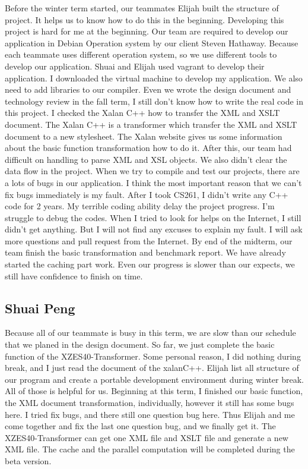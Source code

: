 Before the winter term started, our teammates Elijah built the structure of project. 
It helps us to know how to do this in the beginning. 
Developing this project is hard for me at the beginning.
Our team are required to develop our application in Debian Operation system by our client Steven Hathaway.
Because each teammate uses different operation system, so we use different tools to develop our application.
Shuai and Elijah used vagrant to develop their application.
I downloaded the virtual machine to develop my application.
We also need to add libraries to our compiler.  
Even we wrote the design document and technology review in the fall term, I still don't know how to write the real code in this project. 
I checked the Xalan C++ how to transfer the XML and XSLT document.
The Xalan C++ is a transformer which transfer the XML and XSLT document to a new stylesheet.
The Xalan website gives us some information about the basic function transformation how to do it. 
After this, our team had difficult on handling to parse XML and XSL objects.
We also didn't clear the data flow in the project. 
When we try to compile and test our projects, there are a lots of bugs in our application. 
I think the most important reason that we can’t fix bugs immediately is my fault. 
After I took CS261, I didn’t write any C++ code for 2 years. 
My terrible coding ability delay the project progress. I’m struggle to debug the codes. 
When I tried to look for helps on the Internet, I still didn’t get anything.
But I will not find any excuses to explain my fault. 
I will ask more questions and pull request from the Internet. 
By end of the midterm, our team finish the basic transformation and benchmark report.
We have already started the caching part work. 
Even our progress is slower than our expects, we still have confidence to finish on time. 

\subsection{Shuai Peng}

Because all of our teammate is busy in this term, we are slow than our schedule that we planed in the design document. 
So far, we just complete the basic function of the XZES40-Transformer.
Some personal reason, I did nothing during break, and I just read the document of the xalanC++.
Elijah list all structure of our program and create a portable development environment during winter break. 
All of those is helpful for us.
Beginning at this term, I finished our basic function, the XML document transformation, individually, however it still has some bugs here.
I tried fix bugs, and there still one question bug here.
Thus Elijah and me come together and fix the last one question bug, and we finally get it.
The XZES40-Transformer can get one XML file and XSLT file and generate a new XML file.
The cache and the parallel computation will be completed during the beta version.

